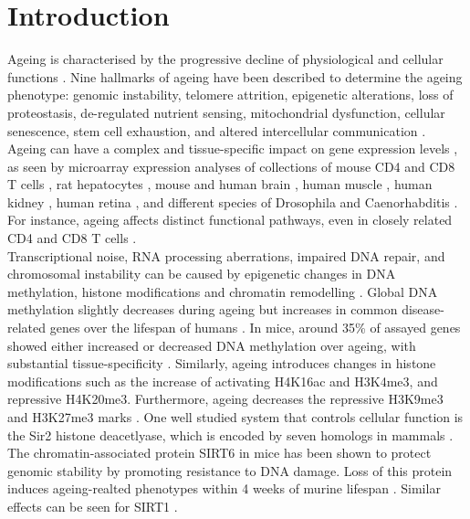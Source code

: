 
\section{Introduction}

Ageing is characterised by the progressive decline of physiological and cellular functions \citep{Lopez-Otin2013, Booth2016}. Nine hallmarks of ageing have been described to determine the ageing phenotype: genomic instability, telomere attrition, epigenetic alterations, loss of proteostasis, de-regulated nutrient sensing, mitochondrial dysfunction, cellular senescence, stem cell exhaustion, and altered intercellular communication \citep{Lopez-Otin2013}. Ageing can have a complex and tissue-specific impact on gene expression levels \citep{Zahn2007}, as seen by microarray expression analyses of collections of mouse CD4\plus{} and CD8\plus{} T cells \citep{Mirza2011}, rat hepatocytes \citep{Tollet-Egnell2000}, mouse and human brain \citep{Lu2004, Lee2000}, human muscle \citep{Welle2003, Zahn2006}, human kidney \citep{Rodwell2004}, human retina \citep{Yoshida2002}, and different species of Drosophila and Caenorhabditis \citep{Mccarroll2004}. For instance, ageing affects distinct functional pathways, even in closely related CD4\plus{} and CD8\plus{} T cells \citep{Mirza2011}. \\

Transcriptional noise, RNA processing aberrations, impaired DNA repair, and chromosomal instability can be caused by epigenetic changes in DNA methylation, histone modifications and chromatin remodelling \citep{Lopez-Otin2013}. Global DNA methylation slightly decreases during ageing but increases in common disease-related genes over the lifespan of humans \citep{Talens2012}. In mice, around 35\% of assayed genes showed either increased or decreased DNA methylation over ageing, with substantial tissue-specificity \citep{Maegawa2010}. Similarly, ageing introduces changes in histone modifications such as the increase of activating \gls{H4K16ac} and \gls{H3K4me3}, and repressive \gls{H4K20me3}. Furthermore, ageing decreases the repressive \gls{H3K9me3} and \gls{H3K27me3} marks \citep{Han2012, Fraga2007}. One well studied system that controls cellular function is the \gls{Sir}2 histone deacetlyase, which is encoded by seven homologs in mammals \citep{Houtkooper2016}. The chromatin-associated protein SIRT6 in mice has been shown to protect genomic stability by promoting resistance to DNA damage. Loss of this protein induces ageing-realted phenotypes within 4 weeks of murine lifespan \cite{Mostoslavsky2006}. Similar effects can be seen for SIRT1 \cite{Oberdoerffer2008}.\\

